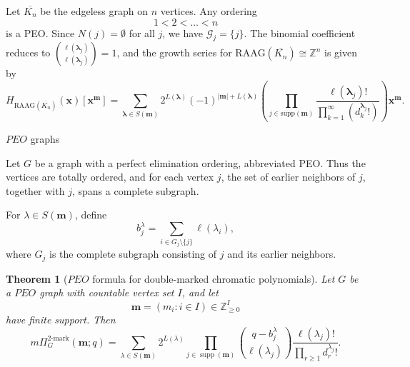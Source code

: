 \documentclass[11pt,reqno]{amsart}
\makeatletter
\numberwithin{equation}{section} %
\newtheorem{thm}{Theorem}
\theoremstyle{definition}
\theoremstyle{remark}
\newcommand{\supp}{\operatorname{supp}}
\numberwithin{equation}{section}
\def\section{\def\@secnumfont{\mdseries}\@startsection{section}{1}%
  \z@{.7\linespacing\@plus\linespacing}{.5\linespacing}%
  {\normalfont\scshape\centering}}
\makeatother
\begin{document}
Let $\overline{K_n}$ be the edgeless graph on $n$ vertices. Any ordering $$1 < 2 < \dots < n$$ is a PEO. Since $N(j) = \emptyset$ for all $j$, we have $\mathcal{G}_j = \{j\}$. The binomial coefficient reduces to $\binom{\ell(\boldsymbol{\lambda}_j)}{\ell(\boldsymbol{\lambda}_j)} = 1$, and the growth series for $\mathrm{RAAG}(\overline{K_n}) \cong \mathbb{Z}^n$ is given by 
\begin{equation*}
H_{\mathrm{RAAG}(\overline{K_n})}(\mathbf{x})[\mathbf{x}^{\mathbf{m}}] = \sum_{\boldsymbol{\lambda} \in S(\mathbf{m})} 2^{L(\boldsymbol{\lambda})} (-1)^{|\mathbf{m}| + L(\boldsymbol{\lambda})}  \left(\prod_{j \in \mathrm{supp}(\mathbf{m})} \frac{\ell(\boldsymbol{\lambda}_{j})!}{\prod_{k=1}^{\infty} \left(d^{\boldsymbol{\lambda}_{j}}_{k}!\right)} \right) \mathbf{x}^{\mathbf{m}}.
\end{equation*}

\iffalse
\section{$PEO$ graphs}

Let \(G\) be a graph with a perfect elimination ordering, abbreviated PEO. Thus the vertices are
totally ordered, and for each vertex \(j\), the set of earlier neighbors of \(j\), together with
\(j\), spans a complete subgraph.

For \(\lambda\in S(\mathbf m)\), define
\[
b_j^\lambda
=
\sum_{i\in G_j\setminus\{j\}}\ell(\lambda_i),
\]
where \(G_j\) is the complete subgraph consisting of \(j\) and its earlier neighbors.

\begin{thm}[$PEO$ formula for double-marked chromatic polynomials]
Let \(G\) be a $PEO$  graph with countable vertex set \(I\), and let
\[
\mathbf m=(m_i:i\in I)\in\mathbb{Z}_{\ge0}^{I}
\]
have finite support. Then
\[
m\Pi_G^{2\text{-mark}}(\mathbf m;q)
=
\sum_{\lambda\in S(\mathbf m)}
2^{L(\lambda)}
\prod_{j\in\supp(\mathbf m)}
\binom{q-b_j^\lambda}{\ell(\lambda_j)}
\frac{\ell(\lambda_j)!}
{\prod_{r\ge1}d_r^{\lambda_j}!}.
\]
\end{thm}
\end{document}

